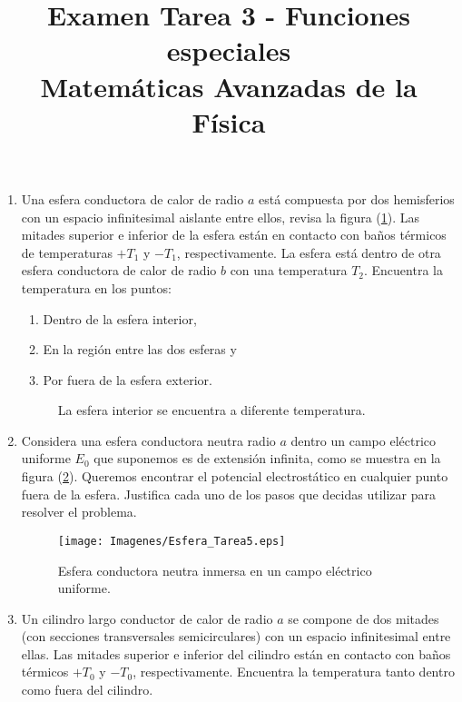 
\pagestyle{fancy}
\fancyhf{}
\rfoot{\thepage}
\renewcommand{\headrulewidth}{0.5pt}
\setlength{\headheight}{30pt} 
\title{Examen Tarea 3 - Funciones especiales \\ \large{Matemáticas Avanzadas de la Física}}
\date{ }

\vspace{-4cm}
\maketitle
\fontsize{14}{14}\selectfont
\begin{enumerate}
\item Una esfera conductora de calor de radio $a$ está compuesta por dos hemisferios con un espacio infinitesimal aislante entre ellos, revisa la figura (\ref{fig:figura2}). Las mitades superior e inferior de la esfera están en contacto con baños térmicos de temperaturas $+ T_{1}$ y $-T_{1}$, respectivamente. La esfera está dentro de otra esfera conductora de calor de radio $b$ con una temperatura $T_{2}$. Encuentra la temperatura en los puntos:
\begin{enumerate}[label=\alph*)]
\item Dentro de la esfera interior,
\item En la región entre las dos esferas y
\item Por fuera de la esfera exterior.
\end{enumerate} 
\begin{figure}[!ht]
\centering

\caption{La esfera interior se encuentra a diferente temperatura.}
\label{fig:figura2}
\end{figure}
\item Considera una esfera conductora neutra radio $a$ dentro un campo eléctrico uniforme  $E_{0}$ que suponemos es de extensión infinita, como se muestra en la figura (\ref{fig:figura3}). Queremos encontrar el potencial electrostático en cualquier punto fuera de la esfera. Justifica cada uno de los pasos que decidas utilizar para resolver el problema.
\begin{figure}[!ht]
\centering
\texttt{[image: Imagenes/Esfera\_Tarea5.eps]}
\caption{Esfera conductora neutra inmersa en un campo eléctrico uniforme.}
\label{fig:figura3}
\end{figure}
\item Un cilindro largo conductor de calor de radio $a$ se compone de dos mitades (con secciones transversales semicirculares) con un espacio infinitesimal entre ellas. Las mitades superior e inferior del cilindro están en contacto con baños térmicos $+T_{0}$ y $-T_{0}$, respectivamente. Encuentra la temperatura tanto dentro como fuera del cilindro.

\end{enumerate}
